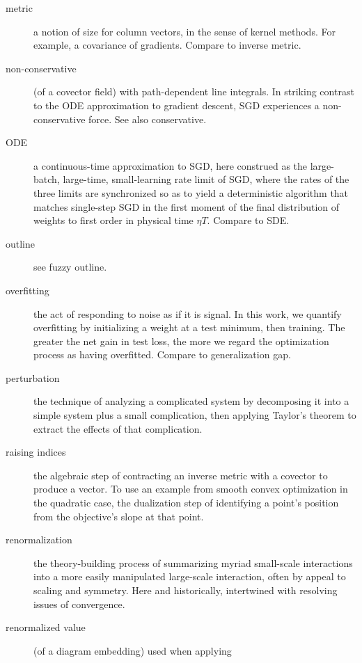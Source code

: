 \documentclass{article}
\theoremstyle{plain}
\theoremstyle{definition}
\begin{document}
\begin{description}
        \item[metric] a notion of size for column vectors, in the sense of
            kernel methods.  For example, a covariance of gradients.  Compare
            to inverse metric.
        \item[non-conservative] (of a covector field) with path-dependent line
            integrals.  In striking contrast to the ODE approximation to
            gradient descent, SGD experiences a non-conservative force.  See
            also conservative.
        \item[ODE] a continuous-time approximation to SGD, here construed as
            the large-batch, large-time, small-learning rate limit of SGD,
            where the rates of the three limits are synchronized so as to yield
            a deterministic algorithm that matches
            single-step SGD in the first moment of the final distribution
            of weights to first order in physical time $\eta T$.  Compare to
            SDE.
        \item[outline] see fuzzy outline.
        \item[overfitting] the act of responding to noise as if it is signal.
            In this work, we quantify overfitting by initializing a weight at a
            test minimum, then training.  The greater the net gain in test
            loss, the more we regard the optimization process as having
            overfitted.  Compare to generalization gap.
        \item[perturbation] the technique of analyzing a complicated system by
            decomposing it into a simple system plus a small complication, then
            applying Taylor's theorem to extract the effects of that
            complication.  
        \item[raising indices] the algebraic step of contracting an inverse
            metric with a covector to produce a vector.  To use an example from
            smooth convex optimization in the quadratic case, the dualization
            step of identifying a point's position from the objective's slope
            at that point.
        \item[renormalization] the theory-building process of summarizing
            myriad small-scale interactions into a more easily manipulated
            large-scale interaction, often by appeal to scaling and symmetry.
            Here and historically, intertwined with resolving issues of
            convergence.  
        \item[renormalized value] (of a diagram embedding) used when applying

\end{description}
\end{document}
